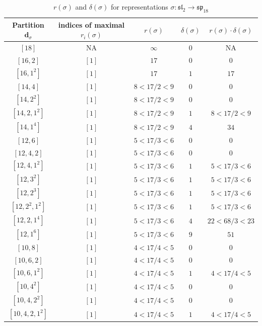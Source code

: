 \documentclass{article}%
\begin{document}
    \begin{center}
    \label{table:sp_18}
    \begin{longtable}{||c|c|c|c|c||}
    \caption{$r(\sigma)$ and $\delta(\sigma)$ for representations $\sigma: \mathfrak{sl}_2 \to \mathfrak{sp}_{18}$}
    \hline
    Partition $\textbf{d}_\sigma$
    &indices of maximal $r_i(\sigma)$
    &$r(\sigma)$
    &$\delta(\sigma)$
    &$r(\sigma) \cdot \delta(\sigma)$
    \\ [0.3ex] \hline\endhead
    $[18]$ & NA & $\infty$ & $0$ & NA \\ \hline 
$[16, 2]$ & $[1]$ & $17$ & $0$ & $0$ \\ \hline 
$[16, 1^{2}]$ & $[1]$ & $17$ & $1$ & $17$ \\ \hline 
$[14, 4]$ & $[1]$ & $8 < 17/2 < 9$ & $0$ & $0$ \\ \hline 
$[14, 2^{2}]$ & $[1]$ & $8 < 17/2 < 9$ & $0$ & $0$ \\ \hline 
$[14, 2, 1^{2}]$ & $[1]$ & $8 < 17/2 < 9$ & $1$ & $8 < 17/2 < 9$ \\ \hline 
$[14, 1^{4}]$ & $[1]$ & $8 < 17/2 < 9$ & $4$ & $34$ \\ \hline 
$[12, 6]$ & $[1]$ & $5 < 17/3 < 6$ & $0$ & $0$ \\ \hline 
$[12, 4, 2]$ & $[1]$ & $5 < 17/3 < 6$ & $0$ & $0$ \\ \hline 
$[12, 4, 1^{2}]$ & $[1]$ & $5 < 17/3 < 6$ & $1$ & $5 < 17/3 < 6$ \\ \hline 
$[12, 3^{2}]$ & $[1]$ & $5 < 17/3 < 6$ & $1$ & $5 < 17/3 < 6$ \\ \hline 
$[12, 2^{3}]$ & $[1]$ & $5 < 17/3 < 6$ & $1$ & $5 < 17/3 < 6$ \\ \hline 
$[12, 2^{2}, 1^{2}]$ & $[1]$ & $5 < 17/3 < 6$ & $1$ & $5 < 17/3 < 6$ \\ \hline 
$[12, 2, 1^{4}]$ & $[1]$ & $5 < 17/3 < 6$ & $4$ & $22 < 68/3 < 23$ \\ \hline 
$[12, 1^{6}]$ & $[1]$ & $5 < 17/3 < 6$ & $9$ & $51$ \\ \hline 
$[10, 8]$ & $[1]$ & $4 < 17/4 < 5$ & $0$ & $0$ \\ \hline 
$[10, 6, 2]$ & $[1]$ & $4 < 17/4 < 5$ & $0$ & $0$ \\ \hline 
$[10, 6, 1^{2}]$ & $[1]$ & $4 < 17/4 < 5$ & $1$ & $4 < 17/4 < 5$ \\ \hline 
$[10, 4^{2}]$ & $[1]$ & $4 < 17/4 < 5$ & $0$ & $0$ \\ \hline 
$[10, 4, 2^{2}]$ & $[1]$ & $4 < 17/4 < 5$ & $0$ & $0$ \\ \hline 
$[10, 4, 2, 1^{2}]$ & $[1]$ & $4 < 17/4 < 5$ & $1$ & $4 < 17/4 < 5$ \\ \hline 

\end{longtable}
\end{center}
\end{document}
